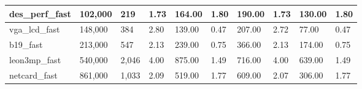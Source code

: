 \begin{table*}[!t]
\begin{tabular}{|l|l|l|l|l|l|l|l|l|l|}
des\_perf\_fast             & 102,000                  & 219                                                           & 1.73                                                           & 164.00                                                       & 1.80                                                              & 190.00                                                       & 1.73                                                           & 130.00                                                       & 1.80                                                           \\ \hline
vga\_lcd\_fast              & 148,000                  & 384                                                           & 2.80                                                           & 139.00                                                       & 0.47                                                              & 207.00                                                       & 2.72                                                           & 77.00                                                        & 0.47                                                           \\ \hline
b19\_fast                   & 213,000                  & 547                                                           & 2.13                                                           & 239.00                                                       & 0.75                                                              & 366.00                                                       & 2.13                                                           & 174.00                                                       & 0.75                                                           \\ \hline
leon3mp\_fast               & 540,000                  & 2,046                                                         & 4.00                                                           & 875.00                                                       & 1.49                                                              & 716.00                                                       & 4.00                                                           & 639.00                                                       & 1.49                                                           \\ \hline
netcard\_fast               & 861,000                  & 1,033                                                         & 2.09                                                           & 519.00                                                       & 1.77                                                              & 609.00                                                       & 2.07                                                           & 306.00                                                       & 1.77                                                           \\ \hline
\end{tabular}
\end{table*}

